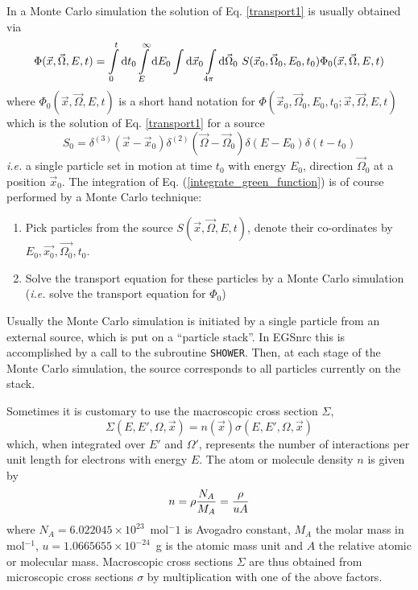 In a Monte Carlo simulation the solution of Eq. \eqref{transport1} 
is usually obtained via 
\begin{equation}
\label{integrate_green_function}
\Phi(\vec{x},\vec{\Omega},E,t) = \int\limits_0^t {\rm d}t_0 
\int\limits_E^\infty {\rm d}E_0 \int {\rm d}\vec{x}_0 \int\limits_{4 \pi} 
{\rm d}\vec{\Omega}_0~ S(\vec{x}_0,\vec{\Omega}_0,E_0,t_0) 
\Phi_0(\vec{x},\vec{\Omega},E,t)
\end{equation}
where $\Phi_0(\vec{x},\vec{\Omega},E,t)$ is a short hand notation 
for $\Phi(\vec{x}_0,\vec{\Omega}_0,E_0,t_0;\vec{x},\vec{\Omega},E,t)$ 
which is the solution of 
Eq. \eqref{transport1} for a source
\begin{equation}
S_0 = \delta^{(3)}(\vec{x} - \vec{x}_0) \delta^{(2)} (\vec{\Omega} - 
\vec{\Omega}_0) \delta(E-E_0) \delta(t - t_0)
\end{equation}
{\em i.e.} a single particle set in motion at time $t_0$ with 
energy $E_0$, direction $\vec{\Omega}_0$ at a position $\vec{x}_0$. 
The integration of Eq. (\eqref{integrate_green_function}) 
is of course performed by a Monte Carlo technique:
\begin{enumerate}
\item
Pick particles from the source $S(\vec{x},\vec{\Omega},E,t)$, 
denote their co-ordinates by $E_0, \vec{x_0}, \vec{\Omega_0}, t_0$. 
\item
Solve the transport equation for these particles by a Monte Carlo 
simulation ({\em i.e.} solve the transport equation for 
$\Phi_0$)
\end{enumerate}
Usually the Monte Carlo simulation is initiated by a single 
particle from an external source, which is put on a ``particle 
stack''. In EGSnrc this is accomplished by a call to the subroutine 
{\tt SHOWER}. Then, at each stage of the Monte Carlo simulation, 
the source corresponds to all particles currently on the stack. 

Sometimes it is customary to use the macroscopic cross section $\Sigma$, 
\begin{equation}
\Sigma(E,E',\Omega,\vec{x}) = n(\vec{x}) \sigma(E,E',\Omega,\vec{x})
\end{equation}
which, when integrated over $E'$ and $\Omega'$, represents the number of 
interactions per unit length for electrons with energy $E$. 
The atom or molecule density $n$ is given by 
\begin{equation}
n = \rho \frac{N_A}{M_A} = {\rho \over u A}
\end{equation} 
where $N_A = 6.022045\times10^{23}$~mol$^-1$ is 
Avogadro constant, $M_A$ the molar mass in mol$^{-1}$, 
$u = 1.0665655\times10^{-24}$~g is the atomic mass unit 
and $A$ the relative atomic or molecular mass. Macroscopic 
cross sections $\Sigma$ are thus obtained from microscopic 
cross sections $\sigma$ by multiplication with one of 
the above factors. 

